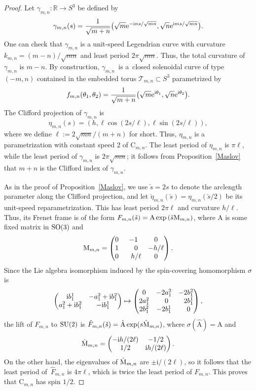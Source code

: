 \documentclass[pdftex]{sigma}
\newcommand\kk{k} %
\def\ri{\mathrm{i}}
\newcommand{\sdown}{\check{s}} %
\def\gam{\gamma} %
\def\R{\mathbb R}
\newcommand\rA{\mathrm{A}}
\newcommand\rC{\mathrm{C}}
\numberwithin{equation}{section}
\begin{document}
\begin{proof} Let $\gam_{m,n}\colon\R\to S^3$ be defined by
\begin{equation}\label{gammn}\gam_{m,n}(s)=\frac{1}{\sqrt{m+n}}\bigl(\sqrt{m}{\rm e}^{-\ri ns/{\sqrt{mn}}}, \sqrt{n}{\rm e}^{\ri ms/{\sqrt{mn}}}\bigr).
\end{equation}
One can check that $\gam_{m,n}$ is a unit-speed Legendrian curve with curvature $\kk_{m,n}=(m-n)/\sqrt{mn}$ and least period $2\pi\sqrt{mn}$. Thus, the total curvature of $\gam_{m,n}$ is $m-n$. By construction, $\gam_{m,n}$~is a~closed solenoidal curve of type $(-m,n)$ contained in the embedded torus ${\mathcal T}_{m,n}\subset S^3$ parametrized by
\[f_{m,n}(\theta_1,\theta_2)=\frac{1}{\sqrt{m+n}}\bigl( \sqrt{m}{\rm e}^{\ri \theta_1}, \sqrt{n}{\rm e}^{\ri \theta_2}\bigr).
\]
The Clifford projection of $\gam_{m,n}$ is
\[\eta_{m,n}(s)=(h, \ell \cos(2s/\ell),\ell \sin(2s/\ell)),
\]
where we define $\ell:=2\sqrt{mn}/(m+n)$ for short.
Thus, $\eta_{m,n}$ is a parametrization with constant speed $2$ of $\rC_{m,n}$. The least period of $\eta_{m,n}$ is $\pi\ell$, while the least period of $\gam_{m,n}$ is $2\pi\sqrt{mn}$; it follows from Proposition~\ref{Maslov} that $m+n$ is the Clifford index of $\gam_{m,n}$.

As in the proof of Proposition~\ref{Maslov},
we use $\sdown = 2s$ to denote the arclength parameter along the Clifford projection, and let $\check{\eta}_{m,n}(\sdown)=\eta_{m,n}(\sdown/2)$ be its unit-speed reparametrization.
This has least period $2\pi \ell$ and curvature $h/\ell$. Thus, its Frenet frame is of the form
$F_{m,n}(\sdown)=\rA \exp \left(\sdown {\rm M}_{m,n}\right)$,
where $\rA$ is some fixed matrix in ${\rm SO}(3)$ and
\[{\rm M}_{m,n}=\begin{pmatrix} 0&-1&0\\1&\hphantom{-} 0&-h/\ell \\0&\hphantom{-}h/\ell &0\end{pmatrix}.\]
Since the Lie algebra isomorphism induced by the spin-covering homomorphism $\sigma$ is
\[ \begin{pmatrix} \ri b^1_1&-a^2_1+\ri b^2_1\\ a^2_1+\ri b^2_1&-\ri b^1_1 \end{pmatrix} \mapsto
\begin{pmatrix} 0 & -2a^2_1 & -2b^2_1\\ 2a^2_1 & \hphantom{-}0 & \hphantom{-} 2b^1_1\\ 2b^2_1 &-2 b^1_1&\hphantom{-}0 \end{pmatrix},
\]
the lift of $F_{m,n}$ to ${\rm SU}(2)$ is $\hat{F}_{m,n}(\sdown) = \hat{{\rA}} \exp(s\hat{{\rm M}}_{m,n})$, where $\sigma(\hat{\rA}) = \rA$ and
\[\hat{{\rm M}}_{m,n}=\begin{pmatrix} -\ri h/(2\ell) & -1/2 \\ 1/2 &\ri h/(2\ell) \end{pmatrix}.
\]
On the other hand, the eigenvalues of $\hat{\rm M}_{m,n}$ are $\pm \ri/(2\ell)$, so it follows that the least period of~$\hat{F}_{m,n}$ is $4\pi\ell$, which is twice the least period of $F_{m,n}$. This proves that $\rC_{m,n}$ has spin $1/2$.
\end{proof}
\end{document}
